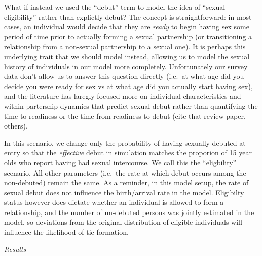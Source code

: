\documentclass [11pt, proquest] {uwthesis}[2015/03/03]
\begin{document}
What if instead we used the ``debut'' term to model the idea of ``sexual
eligibility'' rather than explictly debut? The concept is
straightforward: in most cases, an individual would decide that they are
\emph{ready} to begin having sex some period of time prior to actually
forming a sexual partnership (or transitioning a relationship from a
non-sexual partnership to a sexual one). It is perhaps this underlying
trait that we should model instead, allowing us to model the sexual
history of individuals in our model more completely. Unfortunately our
survey data don't allow us to answer this question directly (i.e.~at
what age did you decide you were ready for sex vs at what age did you
actually start having sex), and the literature has laregly focused more
on individual characteristics and within-partership dynamics that
predict sexual debut rather than quantifying the time to readiness or
the time from readiness to debut (cite that review paper, others).

In this scenario, we change only the probability of having sexually
debuted at entry so that the \emph{effective} debut in simulation
matches the proporion of 15 year olds who report having had sexual
intercourse. We call this the ``eligbility'' scenario. All other
parameters (i.e.~the rate at which debut occurs among the non-debuted)
remain the same. As a reminder, in this model setup, the rate of sexual
debut does not influence the birth/arrival rate in the model. Eligibilty
status however does dictate whether an individual is allowed to form a
relationship, and the number of un-debuted persons was jointly estimated
in the model, so deviations from the original distribution of eligible
individuals will influence the likelihood of tie formation.

\emph{Results}
\end{document}
